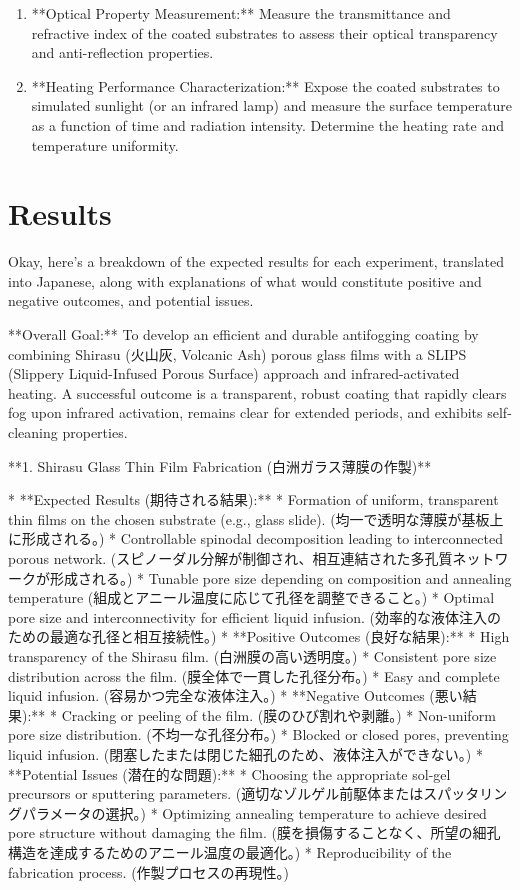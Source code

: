\documentclass{article}
\begin{document}
\begin{enumerate}
\item **Optical Property Measurement:** Measure the transmittance and refractive index of the coated substrates to assess their optical transparency and anti-reflection properties.
\item **Heating Performance Characterization:** Expose the coated substrates to simulated sunlight (or an infrared lamp) and measure the surface temperature as a function of time and radiation intensity. Determine the heating rate and temperature uniformity.
\end{enumerate}
\section{Results}
Okay, here's a breakdown of the expected results for each experiment, translated into Japanese, along with explanations of what would constitute positive and negative outcomes, and potential issues.

**Overall Goal:** To develop an efficient and durable antifogging coating by combining Shirasu (火山灰, Volcanic Ash) porous glass films with a SLIPS (Slippery Liquid-Infused Porous Surface) approach and infrared-activated heating.  A successful outcome is a transparent, robust coating that rapidly clears fog upon infrared activation, remains clear for extended periods, and exhibits self-cleaning properties.

**1. Shirasu Glass Thin Film Fabrication (白洲ガラス薄膜の作製)**

*   **Expected Results (期待される結果):**
    *   Formation of uniform, transparent thin films on the chosen substrate (e.g., glass slide). (均一で透明な薄膜が基板上に形成される。)
    *   Controllable spinodal decomposition leading to interconnected porous network. (スピノーダル分解が制御され、相互連結された多孔質ネットワークが形成される。)
    *   Tunable pore size depending on composition and annealing temperature (組成とアニール温度に応じて孔径を調整できること。)
    *   Optimal pore size and interconnectivity for efficient liquid infusion. (効率的な液体注入のための最適な孔径と相互接続性。)
*   **Positive Outcomes (良好な結果):**
    *   High transparency of the Shirasu film. (白洲膜の高い透明度。)
    *   Consistent pore size distribution across the film. (膜全体で一貫した孔径分布。)
    *   Easy and complete liquid infusion. (容易かつ完全な液体注入。)
*   **Negative Outcomes (悪い結果):**
    *   Cracking or peeling of the film. (膜のひび割れや剥離。)
    *   Non-uniform pore size distribution. (不均一な孔径分布。)
    *   Blocked or closed pores, preventing liquid infusion. (閉塞したまたは閉じた細孔のため、液体注入ができない。)
*   **Potential Issues (潜在的な問題):**
    *   Choosing the appropriate sol-gel precursors or sputtering parameters. (適切なゾルゲル前駆体またはスパッタリングパラメータの選択。)
    *   Optimizing annealing temperature to achieve desired pore structure without damaging the film. (膜を損傷することなく、所望の細孔構造を達成するためのアニール温度の最適化。)
    *   Reproducibility of the fabrication process. (作製プロセスの再現性。)
\end{document}
